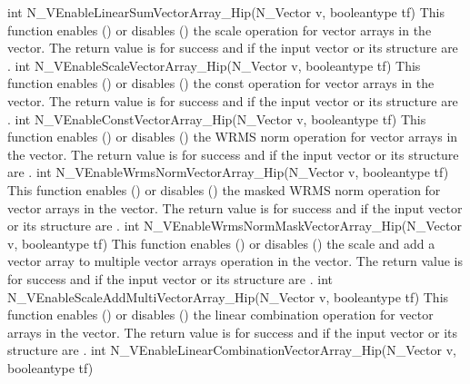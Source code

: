 {
  int N\_VEnableLinearSumVectorArray\_Hip(N\_Vector v, booleantype tf)
}
{
  This function enables () or disables () the scale
  operation for vector arrays in the {\hip} vector. The return value is  for
  success and  if the input vector or its  structure are .
}
{
  int N\_VEnableScaleVectorArray\_Hip(N\_Vector v, booleantype tf)
}
{
  This function enables () or disables () the const
  operation for vector arrays in the {\hip} vector. The return value is  for
  success and  if the input vector or its  structure are .
}
{
  int N\_VEnableConstVectorArray\_Hip(N\_Vector v, booleantype tf)
}
{
  This function enables () or disables () the WRMS norm
  operation for vector arrays in the {\hip} vector. The return value is  for
  success and  if the input vector or its  structure are .
}
{
  int N\_VEnableWrmsNormVectorArray\_Hip(N\_Vector v, booleantype tf)
}
{
  This function enables () or disables () the masked WRMS
  norm operation for vector arrays in the {\hip} vector. The return value is
   for success and  if the input vector or its  structure are
  .
}
{
  int N\_VEnableWrmsNormMaskVectorArray\_Hip(N\_Vector v, booleantype tf)
}
{
  This function enables () or disables () the scale and
  add a vector array to multiple vector arrays operation in the {\hip} vector. The
  return value is  for success and  if the input vector or its
   structure are .
}
{
  int N\_VEnableScaleAddMultiVectorArray\_Hip(N\_Vector v, booleantype tf)
}
{
  This function enables () or disables () the linear
  combination operation for vector arrays in the {\hip} vector. The return value
  is  for success and  if the input vector or its  structure
  are .
}
{
  int N\_VEnableLinearCombinationVectorArray\_Hip(N\_Vector v,
  booleantype tf)
}
